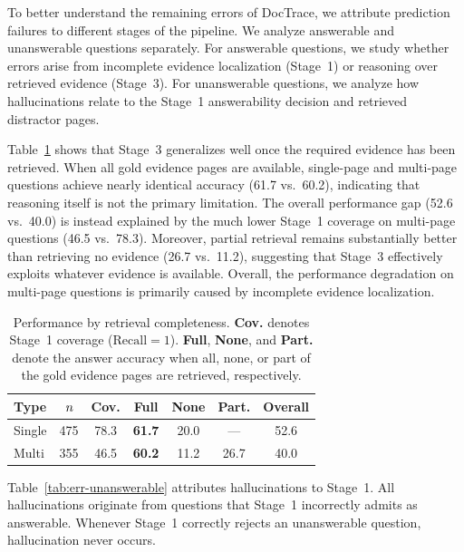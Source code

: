 \documentclass[letterpaper]{article} %
\begin{document}
To better understand the remaining errors of DocTrace, we attribute prediction failures to different stages of the pipeline. We analyze answerable and unanswerable questions separately. For answerable questions, we study whether errors arise from incomplete evidence localization (Stage~1) or reasoning over retrieved evidence (Stage~3). For unanswerable questions, we analyze how hallucinations relate to the Stage~1 answerability decision and retrieved distractor pages.

Table~\ref{tab:err-answerable} shows that Stage~3 generalizes well once the required evidence has been retrieved. When all gold evidence pages are available, single-page and multi-page questions achieve nearly identical accuracy (61.7 vs.~60.2), indicating that reasoning itself is not the primary limitation. The overall performance gap (52.6 vs.~40.0) is instead explained by the much lower Stage~1 coverage on multi-page questions (46.5 vs.~78.3). Moreover, partial retrieval remains substantially better than retrieving no evidence (26.7 vs.~11.2), suggesting that Stage~3 effectively exploits whatever evidence is available. Overall, the performance degradation on multi-page questions is primarily caused by incomplete evidence localization.
\begin{table}[h]
\centering


\begin{tabular}{lcccccc}
\toprule
\textbf{Type}
&
$\emph n$
&
\textbf{Cov.}
&
\textbf{Full}
&
\textbf{None}
&
\textbf{Part.}
&
\textbf{Overall}
\\
\midrule

Single
&
475
&
78.3
&
\textbf{61.7}
&
20.0
&
---
&
52.6
\\

Multi
&
355
&
46.5
&
\textbf{60.2}
&
11.2
&
26.7
&
40.0
\\

\bottomrule
\end{tabular}

\caption{
Performance by retrieval completeness.
\textbf{Cov.} denotes Stage~1 coverage ($\mathrm{Recall}=1$).
\textbf{Full}, \textbf{None}, and \textbf{Part.} denote the answer accuracy when all, none, or part of the gold evidence pages are retrieved, respectively.
}

\label{tab:err-answerable}
\end{table}


Table~\ref{tab:err-unanswerable} attributes hallucinations to Stage~1. All
hallucinations originate from questions that Stage~1 incorrectly admits as
answerable. Whenever Stage~1 correctly rejects an unanswerable question,
hallucination never occurs.
\end{document}
